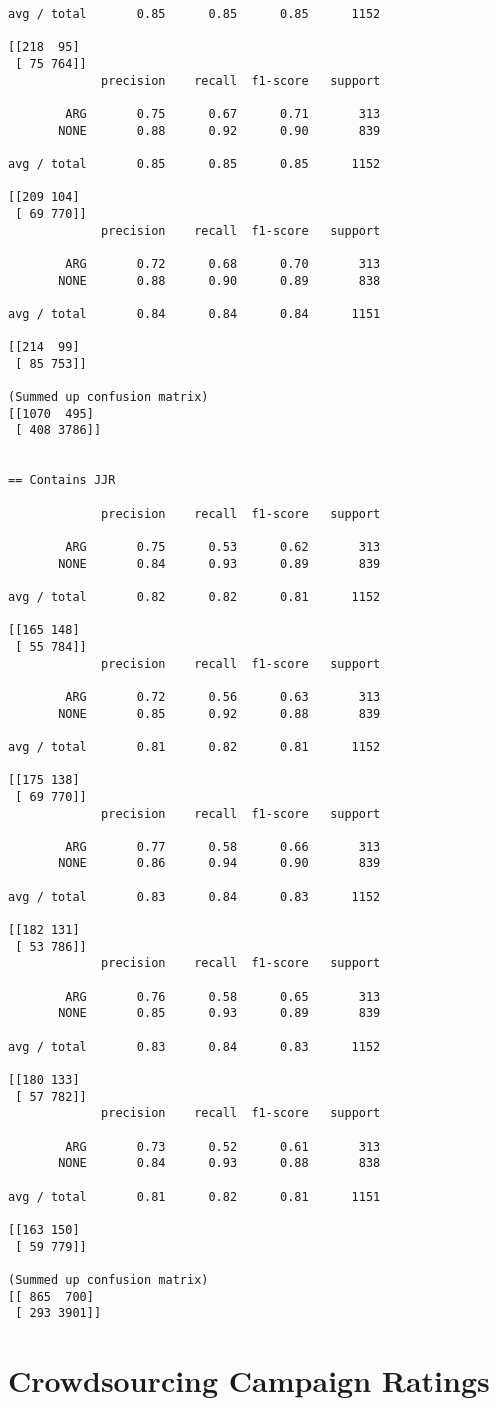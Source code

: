 \begin{appendices}
\begin{verbatim}
avg / total       0.85      0.85      0.85      1152

[[218  95]
 [ 75 764]]
             precision    recall  f1-score   support

        ARG       0.75      0.67      0.71       313
       NONE       0.88      0.92      0.90       839

avg / total       0.85      0.85      0.85      1152

[[209 104]
 [ 69 770]]
             precision    recall  f1-score   support

        ARG       0.72      0.68      0.70       313
       NONE       0.88      0.90      0.89       838

avg / total       0.84      0.84      0.84      1151

[[214  99]
 [ 85 753]]

(Summed up confusion matrix)
[[1070  495]
 [ 408 3786]]


== Contains JJR

             precision    recall  f1-score   support

        ARG       0.75      0.53      0.62       313
       NONE       0.84      0.93      0.89       839

avg / total       0.82      0.82      0.81      1152

[[165 148]
 [ 55 784]]
             precision    recall  f1-score   support

        ARG       0.72      0.56      0.63       313
       NONE       0.85      0.92      0.88       839

avg / total       0.81      0.82      0.81      1152

[[175 138]
 [ 69 770]]
             precision    recall  f1-score   support

        ARG       0.77      0.58      0.66       313
       NONE       0.86      0.94      0.90       839

avg / total       0.83      0.84      0.83      1152

[[182 131]
 [ 53 786]]
             precision    recall  f1-score   support

        ARG       0.76      0.58      0.65       313
       NONE       0.85      0.93      0.89       839

avg / total       0.83      0.84      0.83      1152

[[180 133]
 [ 57 782]]
             precision    recall  f1-score   support

        ARG       0.73      0.52      0.61       313
       NONE       0.84      0.93      0.88       838

avg / total       0.81      0.82      0.81      1151

[[163 150]
 [ 59 779]]
 
(Summed up confusion matrix)
[[ 865  700]
 [ 293 3901]]

\end{verbatim}

\chapter{Crowdsourcing Campaign Ratings}
\end{appendices}